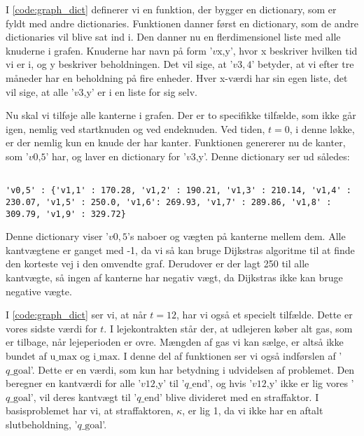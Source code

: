 I \autoref{code:graph_dict} definerer vi en funktion, der bygger en dictionary, som er fyldt med andre dictionaries. Funktionen danner først en dictionary, som de andre dictionaries vil blive sat ind i.
Den danner nu en flerdimensionel liste med alle knuderne i grafen. Knuderne har navn på form '$v\textrm{x,y}$', hvor x beskriver hvilken tid vi er i, og y beskriver beholdningen. Det vil sige, at '$v3,4$' betyder, at vi efter tre måneder har en beholdning på fire enheder. Hver x-værdi har sin egen liste, det vil sige, at alle '$v\textrm{3,y}$' er i en liste for sig selv.

Nu skal vi tilføje alle kanterne i grafen. Der er to specifikke tilfælde, som ikke går igen, nemlig ved startknuden og ved endeknuden. Ved tiden, $t=0$, i denne løkke, er der nemlig kun en knude der har kanter. Funktionen genererer nu de kanter, som '$v\textrm{0,5}$' har, og laver en dictionary for '$v\textrm{3,y}$'. 
Denne dictionary ser ud således:

\begin{lstlisting}[label=code:q05, caption=Dictionary for $v \textrm{0,5}$.]

'v0,5' : {'v1,1' : 170.28, 'v1,2' : 190.21, 'v1,3' : 210.14, 'v1,4' : 230.07, 'v1,5' : 250.0, 'v1,6': 269.93, 'v1,7' : 289.86, 'v1,8' : 309.79, 'v1,9' : 329.72}
\end{lstlisting}
Denne dictionary viser '$v0,5$'s naboer og vægten på kanterne mellem dem. Alle kantvægtene er ganget med -1, da vi så kan bruge Dijkstras algoritme til at finde den korteste vej i den omvendte graf. Derudover er der lagt 250 til alle kantvægte, så ingen af kanterne har negativ vægt, da Dijkstras ikke kan bruge negative vægte. 

I \autoref{code:graph_dict} ser vi, at når $t=12$, har vi også et specielt tilfælde. Dette er vores sidste værdi for $t$. I lejekontrakten står der, at udlejeren køber alt gas, som er tilbage, når lejeperioden er ovre. Mængden af gas vi kan sælge, er altså ikke bundet af $\textrm{u\_max}$ og $\textrm{i\_max}$. I denne del af funktionen ser vi også indførslen af '$q\textrm{\_goal}$'. Dette er en værdi, som kun har betydning i udvidelsen af problemet. Den beregner  en kantværdi for alle '$v\textrm{12,y}$' til '$q\textrm{\_end}$', og hvis '$v\textrm{12,y}$' ikke er lig vores '$q\textrm{\_goal}$', vil deres kantvægt til '$q\textrm{\_end}$' blive divideret med en straffaktor. I basisproblemet har vi, at straffaktoren, $\kappa$, er lig 1, da vi ikke har en aftalt slutbeholdning, '$q\textrm{\_goal}$'.

